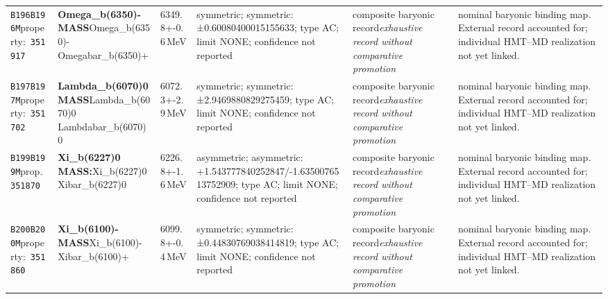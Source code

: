 \begin{landscape}
\begin{longtable}{L{1.85cm}L{4.45cm}L{2.35cm}L{4.05cm}L{3.35cm}L{7.15cm}}
\texttt{B196}\newline \texttt{B196M}\newline property:\ \texttt{351917} & \textbf{Omega\_\allowbreak{}b(6350)- MASS}\newline Omega\_\allowbreak{}b(6350)- \textbar{}\allowbreak{} Omegabar\_\allowbreak{}b(6350)+ & 6349.8+-0.6\,MeV & symmetric; symmetric: ±0.60080400015155633; type AC; limit NONE; confidence not reported & composite baryonic record\newline \emph{exhaustive record without comparative promotion} & nominal baryonic binding map. External record accounted for; individual HMT--MD realization not yet linked. \\
\texttt{B197}\newline \texttt{B197M}\newline property:\ \texttt{351702} & \textbf{Lambda\_\allowbreak{}b(6070)0 MASS}\newline Lambda\_\allowbreak{}b(6070)0 \textbar{}\allowbreak{} Lambdabar\_\allowbreak{}b(6070)0 & 6072.3+-2.9\,MeV & symmetric; symmetric: ±2.9469880829275459; type AC; limit NONE; confidence not reported & composite baryonic record\newline \emph{exhaustive record without comparative promotion} & nominal baryonic binding map. External record accounted for; individual HMT--MD realization not yet linked. \\
\texttt{B199}\newline \texttt{B199M}\newline prop.\ \texttt{351870} & \textbf{Xi\_\allowbreak{}b(6227)0 MASS:}\newline Xi\_\allowbreak{}b(6227)0 \textbar{}\allowbreak{} Xibar\_\allowbreak{}b(6227)0 & 6226.8+-1.6\,MeV & asymmetric; asymmetric: +1.543777840252847/-1.6350076513752909; type AC; limit NONE; confidence not reported & composite baryonic record\newline \emph{exhaustive record without comparative promotion} & nominal baryonic binding map. External record accounted for; individual HMT--MD realization not yet linked. \\
\texttt{B200}\newline \texttt{B200M}\newline property:\ \texttt{351860} & \textbf{Xi\_\allowbreak{}b(6100)- MASS}\newline Xi\_\allowbreak{}b(6100)- \textbar{}\allowbreak{} Xibar\_\allowbreak{}b(6100)+ & 6099.8+-0.4\,MeV & symmetric; symmetric: ±0.44830769038414819; type AC; limit NONE; confidence not reported & composite baryonic record\newline \emph{exhaustive record without comparative promotion} & nominal baryonic binding map. External record accounted for; individual HMT--MD realization not yet linked. \\

\end{longtable}
\end{landscape}
